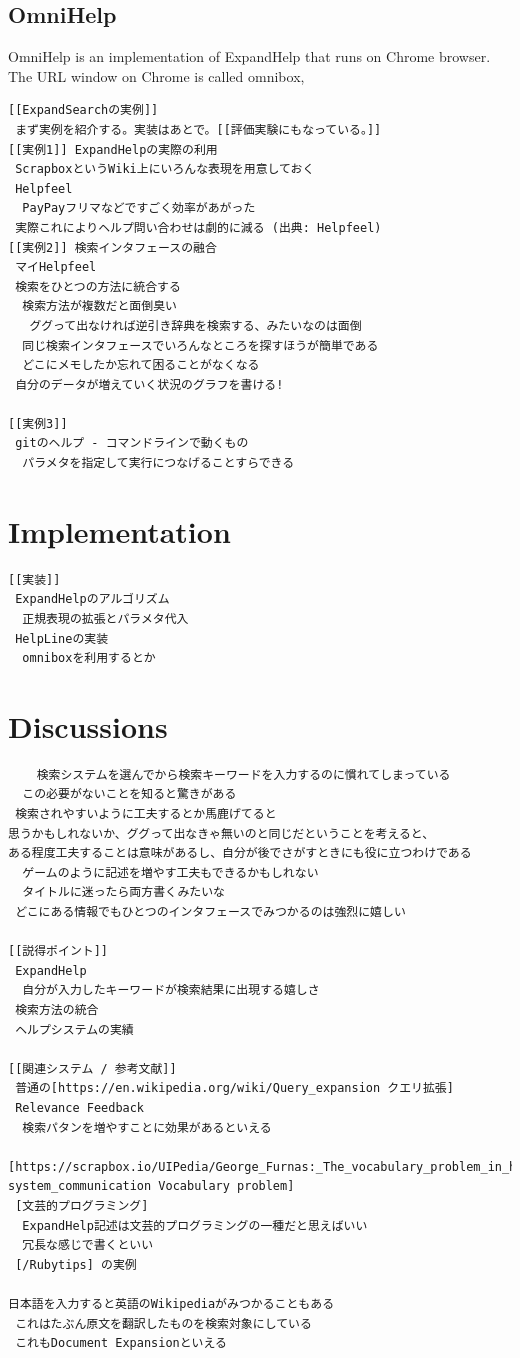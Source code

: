 \documentclass[manuscript,screen,review]{acmart}
\begin{document}
\subsection{OmniHelp}

OmniHelp is an implementation of ExpandHelp that runs on Chrome browser.
The URL window on Chrome is called omnibox, 

\begin{verbatim}
[[ExpandSearchの実例]]
 まず実例を紹介する。実装はあとで。[[評価実験にもなっている。]]
[[実例1]] ExpandHelpの実際の利用
 ScrapboxというWiki上にいろんな表現を用意しておく
 Helpfeel
  PayPayフリマなどですごく効率があがった
 実際これによりヘルプ問い合わせは劇的に減る (出典: Helpfeel)
[[実例2]] 検索インタフェースの融合
 マイHelpfeel
 検索をひとつの方法に統合する
  検索方法が複数だと面倒臭い
   ググって出なければ逆引き辞典を検索する、みたいなのは面倒
  同じ検索インタフェースでいろんなところを探すほうが簡単である
  どこにメモしたか忘れて困ることがなくなる
 自分のデータが増えていく状況のグラフを書ける!

[[実例3]]
 gitのヘルプ - コマンドラインで動くもの
  パラメタを指定して実行につなげることすらできる
\end{verbatim}

\section{Implementation}

\begin{verbatim}
[[実装]]
 ExpandHelpのアルゴリズム
  正規表現の拡張とパラメタ代入
 HelpLineの実装
  omniboxを利用するとか
\end{verbatim}

\section{Discussions}

\begin{verbatim}
    検索システムを選んでから検索キーワードを入力するのに慣れてしまっている
  この必要がないことを知ると驚きがある
 検索されやすいように工夫するとか馬鹿げてると
思うかもしれないか、ググって出なきゃ無いのと同じだということを考えると、
ある程度工夫することは意味があるし、自分が後でさがすときにも役に立つわけである
  ゲームのように記述を増やす工夫もできるかもしれない
  タイトルに迷ったら両方書くみたいな
 どこにある情報でもひとつのインタフェースでみつかるのは強烈に嬉しい

[[説得ポイント]]
 ExpandHelp
  自分が入力したキーワードが検索結果に出現する嬉しさ
 検索方法の統合
 ヘルプシステムの実績

[[関連システム / 参考文献]]
 普通の[https://en.wikipedia.org/wiki/Query_expansion クエリ拡張]
 Relevance Feedback
  検索パタンを増やすことに効果があるといえる
 [https://scrapbox.io/UIPedia/George_Furnas:_The_vocabulary_problem_in_human-system_communication Vocabulary problem]
 [文芸的プログラミング]
  ExpandHelp記述は文芸的プログラミングの一種だと思えばいい
  冗長な感じで書くといい
 [/Rubytips] の実例

日本語を入力すると英語のWikipediaがみつかることもある
 これはたぶん原文を翻訳したものを検索対象にしている
 これもDocument Expansionといえる

\end{verbatim}
\end{document}
